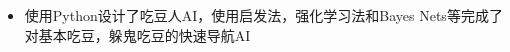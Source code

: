 \documentclass[9pt,a4paper]{altacv}
\begin{document}
\begin{fullwidth}
\begin{multicols}{2}
		\divider
		
		\begin{itemize}
			\item 使用Python设计了吃豆人AI，使用启发法，强化学习法和Bayes Nets等完成了对基本吃豆，躲鬼吃豆的快速导航AI
		\end{itemize}
		
	\end{multicols}
	
\end{fullwidth}


\end{document}
